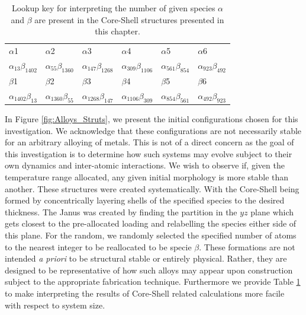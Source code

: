 \begin{table}
\centering
\caption{Lookup key for interpreting the number of given species $\alpha$ and $\beta$ are present in the Core-Shell structures presented in this chapter.}
\label{tab:cs_lookup}
\begin{tabular}{llllll}
\toprule
$\alpha$1                 & $\alpha$2                 & $\alpha$3                  & $\alpha$4                  & $\alpha$5                 & $\alpha$6                \\
$\alpha_{13}\beta_{1402}$ & $\alpha_{55}\beta_{1360}$ & $\alpha_{147}\beta_{1268}$ & $\alpha_{309}\beta_{1106}$ & $\alpha_{561}\beta_{854}$ & $\alpha_{923}\beta_{492}$ \\
\hline
$\beta$1                  & $\beta$2                  & $\beta$3                  & $\beta$4                   & $\beta$5                  & $\beta$6                  \\
$\alpha_{1402}\beta_{13}$ & $\alpha_{1360}\beta_{55}$ & $\alpha_{1268}\beta_{147}$ & $\alpha_{1106}\beta_{309}$ & $\alpha_{854}\beta_{561}$ & $\alpha_{492}\beta_{923}$ \\
\bottomrule
\end{tabular}%
\end{table}

In Figure \ref{fig:Alloys_Struts}, we present the initial configurations chosen for this investigation. We acknowledge that these configurations are not necessarily stable for an arbitrary alloying of metals. This is not of a direct concern as the goal of this investigation is to determine how such systems may evolve subject to their own dynamics and inter-atomic interactions. We wish to observe if, given the temperature range allocated, any given initial morphology is more stable than another. These structures were created systematically. With the Core-Shell being formed by concentrically layering shells of the specified species to the desired thickness. The Janus was created by finding the partition in the $yz$ plane which gets closest to the pre-allocated loading and relabelling the species either side of this plane. For the random, we randomly selected the specified number of atoms to the nearest integer to be reallocated to be specie $\beta$. These formations are not intended \textit{a priori} to be structural stable or entirely physical. Rather, they are designed to be representative of how such alloys may appear upon construction subject to the appropriate fabrication technique. Furthermore we provide Table \ref{tab:cs_lookup} to make interpreting the results of Core-Shell related calculations more facile with respect to system size. 

